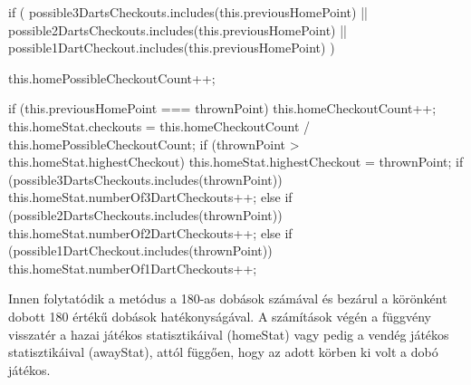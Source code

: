 \begin{cpp}      
      if (
        possible3DartsCheckouts.includes(this.previousHomePoint) ||
        possible2DartsCheckouts.includes(this.previousHomePoint) ||
        possible1DartCheckout.includes(this.previousHomePoint)
      ) {
        this.homePossibleCheckoutCount++;
        
        if (this.previousHomePoint === thrownPoint) {
          this.homeCheckoutCount++;
          this.homeStat.checkouts =
            this.homeCheckoutCount / this.homePossibleCheckoutCount;
          if (thrownPoint > this.homeStat.highestCheckout) {
            this.homeStat.highestCheckout = thrownPoint;
          }
          if (possible3DartsCheckouts.includes(thrownPoint)) {
            this.homeStat.numberOf3DartCheckouts++;
          } else if (possible2DartsCheckouts.includes(thrownPoint)) {
            this.homeStat.numberOf2DartCheckouts++;
          } else if (possible1DartCheckout.includes(thrownPoint)) {
            this.homeStat.numberOf1DartCheckouts++;
          }
        }
      }
      
\end{cpp}

Innen folytatódik a metódus a 180-as dobások számával és bezárul a körönként dobott 180 értékű dobások hatékonyságával. A számítások végén a függvény visszatér a hazai játékos statisztikáival (homeStat) vagy pedig a vendég játékos statisztikáival (awayStat), attól függően, hogy az adott körben ki volt a dobó játékos.

